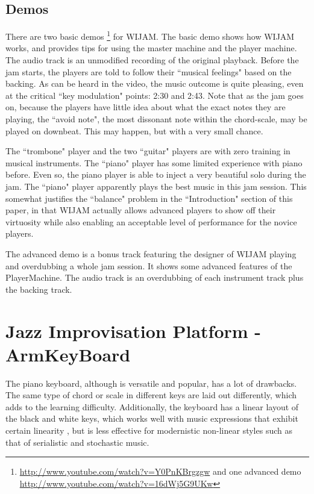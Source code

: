 \subsection{Demos}
There are two basic demos \footnote{\url{http://www.youtube.com/watch?v=Y0PnKBrgzgw} and one advanced demo \url{http://www.youtube.com/watch?v=16dWj5G9UKw}} for WIJAM. The basic demo shows how WIJAM works, and provides tips for using the master machine and the player machine. The audio track is an unmodified recording of the original playback. Before the jam starts, the players are told to follow their ``musical feelings" based on the backing. As can be heard in the video, the music outcome is quite pleasing, even at the critical ``key modulation" points: 2:30 and 2:43. Note that as the jam goes on, because the players have little idea about what the exact notes they are playing, the ``avoid note", the most dissonant note within the chord-scale, may be played on downbeat. This may happen, but with a very small chance.

The ``trombone" player and the two ``guitar" players are with zero training in musical instruments. The ``piano" player has some limited
experience with piano before. Even so, the piano player is able to inject a very beautiful solo during the jam. The ``piano" player apparently plays the best music in this jam session. This somewhat justifies the ``balance" problem in the ``Introduction" section of this paper, in that WIJAM actually allows advanced players to show off their virtuosity while also enabling an acceptable level of performance for the novice players.

The advanced demo is a bonus track featuring the designer of WIJAM playing and overdubbing a whole jam session. It shows some advanced features of the PlayerMachine. The audio track is an overdubbing of each instrument track plus the backing track.

\section{Jazz Improvisation Platform - ArmKeyBoard} \label{sec:5-akb}
The piano keyboard, although is versatile and popular, has a lot of drawbacks. The same type of chord or scale in different keys are laid out differently, which adds to the learning difficulty. Additionally, the keyboard has a linear layout of the black and white keys, which works well with music expressions that exhibit certain linearity , but is less effective for modernistic non-linear styles such as that of serialistic and stochastic music\cite{Mitsuko:Schoenberg}.

